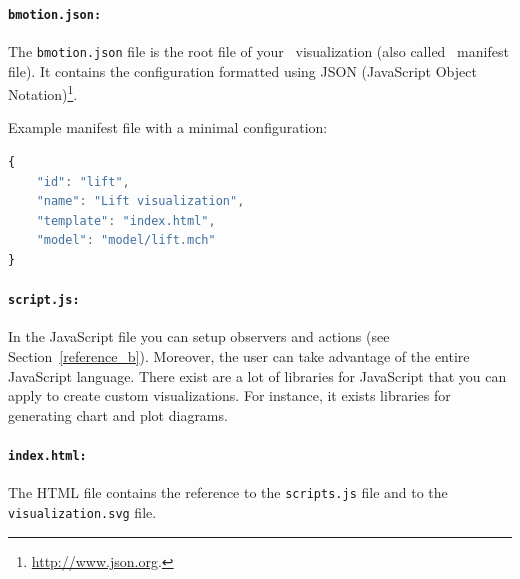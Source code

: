 \paragraph{\texttt{bmotion.json:}}
The \texttt{bmotion.json} file is the root file of your \bms\ visualization (also called \bms\ manifest file).
It contains the configuration formatted using JSON (JavaScript Object Notation)\footnote{\url{http://www.json.org}.}.



Example manifest file with a minimal configuration:

\begin{lstlisting}[language=JavaScript]
{
	"id": "lift",
    "name": "Lift visualization",
    "template": "index.html",
    "model": "model/lift.mch"
}
\end{lstlisting}


\paragraph{\texttt{script.js:}}
In the JavaScript file you can setup observers and actions (see Section~\ref{reference_b}).
Moreover, the user can take advantage of the entire JavaScript language.
There exist are a lot of libraries for JavaScript that you can apply to create custom visualizations.
For instance, it exists libraries for generating chart and plot diagrams.


\paragraph{\texttt{index.html:}}
The HTML file contains the reference to the \texttt{scripts.js} file and to the \texttt{visualization.svg} file.

